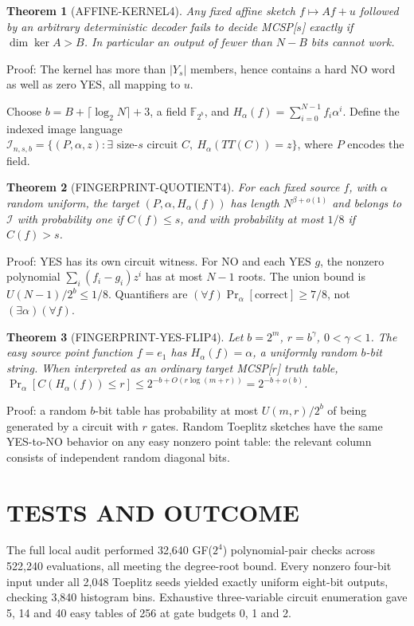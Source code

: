 \documentclass{article}
\newtheorem{theorem}{Theorem}
\begin{document}
\begin{theorem}[AFFINE-KERNEL4]
Any fixed affine sketch $f\mapsto Af+u$ followed by an arbitrary deterministic decoder fails to decide MCSP[$s$] exactly if $\dim\ker A>B$. In particular an output of fewer than $N-B$ bits cannot work.
\end{theorem}
\noindent Proof: The kernel has more than $|Y_s|$ members, hence contains a hard NO word as well as zero YES, all mapping to $u$.

Choose $b=B+\lceil\log_2N\rceil+3$, a field $\mathbb F_{2^b}$, and $H_\alpha(f)=\sum_{i=0}^{N-1}f_i\alpha^i$. Define the indexed image language
$\mathcal I_{n,s,b}=\{(P,\alpha,z):\exists \text{ size-}s\text{ circuit } C,\ H_\alpha(TT(C))=z\}$, where $P$ encodes the field.

\begin{theorem}[FINGERPRINT-QUOTIENT4]
For each fixed source $f$, with $\alpha$ random uniform, the target $(P,\alpha,H_\alpha(f))$ has length $N^{\beta+o(1)}$ and belongs to $\mathcal I$ with probability one if $C(f)\le s$, and with probability at most $1/8$ if $C(f)>s$.
\end{theorem}
\noindent Proof: YES has its own circuit witness. For NO and each YES $g$, the nonzero polynomial $\sum_i(f_i-g_i)z^i$ has at most $N-1$ roots. The union bound is $U(N-1)/2^b\le1/8$. Quantifiers are $(\forall f)\Pr_\alpha[\text{correct}]\ge7/8$, not $(\exists\alpha)(\forall f)$.

\begin{theorem}[FINGERPRINT-YES-FLIP4]
Let $b=2^m$, $r=b^\gamma$, $0<\gamma<1$. The easy source point function $f=e_1$ has $H_\alpha(f)=\alpha$, a uniformly random $b$-bit string. When interpreted as an ordinary target MCSP[$r$] truth table,
$\Pr_\alpha[C(H_\alpha(f))\le r]\le2^{-b+O(r\log(m+r))}=2^{-b+o(b)}$.
\end{theorem}
\noindent Proof: a random $b$-bit table has probability at most $U(m,r)/2^b$ of being generated by a circuit with $r$ gates. Random Toeplitz sketches have the same YES-to-NO behavior on any easy nonzero point table: the relevant column consists of independent random diagonal bits.

\section{TESTS AND OUTCOME}
The full local audit performed 32,640 GF($2^4$) polynomial-pair checks across 522,240 evaluations, all meeting the degree-root bound. Every nonzero four-bit input under all 2,048 Toeplitz seeds yielded exactly uniform eight-bit outputs, checking 3,840 histogram bins. Exhaustive three-variable circuit enumeration gave 5, 14 and 40 easy tables of 256 at gate budgets 0, 1 and 2.
\end{document}
